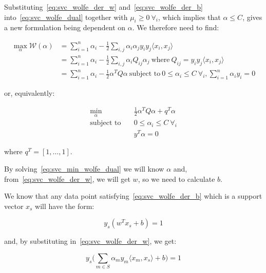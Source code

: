 Substituting~\eqref{eq:svc_wolfe_der_w} and~\eqref{eq:svc_wolfe_der_b} into~\eqref{eq:svc_wolfe_dual} together with $\mu_i\geq 0 \ \forall_i$, which implies that $\alpha\leq C$, gives a new formulation being dependent on $\alpha$. We therefore need to find:

\begin{equation} \label{eq:svc_max_wolfe_dual}
	\begin{aligned}
    	\max_{\alpha} \mathcal{W}(\alpha) &= \sum_{i=1}^n \alpha_i - \frac{1}{2}\sum_{i,j}\alpha_i\alpha_j y_i y_j \langle x_i, x_j \rangle \\
    	&= \sum_{i=1}^n \alpha_i - \frac{1}{2}\sum_{i,j}\alpha_i Q_{ij}\alpha_j \ \text{where} \ Q_{ij} = y_i y_j \langle x_i, x_j \rangle \\
    	&= \sum_{i=1}^n \alpha_i - \frac{1}{2}\alpha^T Q\alpha \ \text{subject to} \ 0\leq\alpha_i\leq C \ \forall_i, \sum_{i=1}^n \alpha_i y_i=0 
	\end{aligned}
\end{equation}

or, equivalently:

\begin{equation} \label{eq:svc_min_wolfe_dual}
    \begin{aligned}
        \min_{\alpha} \quad & \frac{1}{2}\alpha^T Q\alpha+q^T\alpha \\
            \text{subject to} \quad & 0\leq\alpha_i\leq C \ \forall_i \\ & y^T\alpha=0
    \end{aligned}
\end{equation}

where $q^T = [1, \dots, 1]$.

By solving~\eqref{eq:svc_min_wolfe_dual} we will know $\alpha$ and, from~\eqref{eq:svc_wolfe_der_w}, we will get $w$, so we need to calculate $b$.

We know that any data point satisfying~\eqref{eq:svc_wolfe_der_b} which is a support vector $x_s$ will have the form:

\begin{equation} \label{eq:svc_sv_const1}
	y_s(w^T x_s + b)=1
\end{equation}

and, by substituting in~\eqref{eq:svc_wolfe_der_w}, we get:

\begin{equation} \label{eq:svc_sv_const2}
	y_s\big(\sum_{m\in S}\alpha_m y_m \langle x_m, x_s \rangle +b\big)=1
\end{equation}

